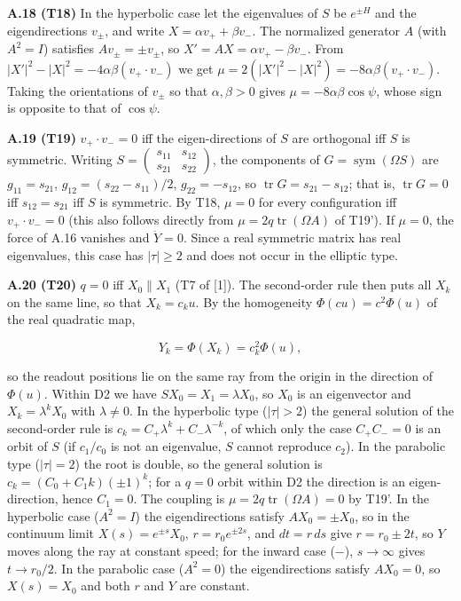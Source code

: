 \documentclass[
  a4paper,
]{article}
\begin{document}
\textbf{A.18 (T18)} In the hyperbolic case let the eigenvalues of \(S\)
be \(e^{\pm H}\) and the eigendirections \(v_\pm\), and write
\(X=\alpha v_++\beta v_-\). The normalized generator \(A\) (with
\(A^2=I\)) satisfies \(Av_\pm=\pm v_\pm\), so
\(X'=AX=\alpha v_+-\beta v_-\). From
\(\lvert X'\rvert^2-\lvert X\rvert^2=-4\alpha\beta(v_+\!\cdot v_-)\) we
get
\(\mu=2(\lvert X'\rvert^2-\lvert X\rvert^2)=-8\alpha\beta(v_+\!\cdot v_-)\).
Taking the orientations of \(v_\pm\) so that \(\alpha,\beta>0\) gives
\(\mu=-8\alpha\beta\cos\psi\), whose sign is opposite to that of
\(\cos\psi\).

\textbf{A.19 (T19)} \(v_+\!\cdot v_-=0\) iff the eigen-directions of
\(S\) are orthogonal iff \(S\) is symmetric. Writing
\(S=\begin{pmatrix}s_{11}&s_{12}\\s_{21}&s_{22}\end{pmatrix}\), the
components of \(G=\operatorname{sym}(\Omega S)\) are \(g_{11}=s_{21}\),
\(g_{12}=(s_{22}-s_{11})/2\), \(g_{22}=-s_{12}\), so
\(\operatorname{tr}G=s_{21}-s_{12}\); that is, \(\operatorname{tr}G=0\)
iff \(s_{12}=s_{21}\) iff \(S\) is symmetric. By T18, \(\mu=0\) for
every configuration iff \(v_+\!\cdot v_-=0\) (this also follows directly
from \(\mu=2q\operatorname{tr}(\Omega A)\) of T19'). If \(\mu=0\), the
force of A.16 vanishes and \(\ddot Y=0\). Since a real symmetric matrix
has real eigenvalues, this case has \(\lvert\tau\rvert\ge2\) and does
not occur in the elliptic type.

\textbf{A.20 (T20)} \(q=0\) iff \(X_0\parallel X_1\) (T7 of {[}1{]}).
The second-order rule then puts all \(X_k\) on the same line, so that
\(X_k=c_ku\). By the homogeneity \(\Phi(cu)=c^2\Phi(u)\) of the real
quadratic map,

\[
Y_k=\Phi(X_k)=c_k^2\Phi(u),
\]

so the readout positions lie on the same ray from the origin in the
direction of \(\Phi(u)\). Within D2 we have \(SX_0=X_1=\lambda X_0\), so
\(X_0\) is an eigenvector and \(X_k=\lambda^kX_0\) with
\(\lambda\neq0\). In the hyperbolic type (\(\lvert\tau\rvert>2\)) the
general solution of the second-order rule is
\(c_k=C_+\lambda^k+C_-\lambda^{-k}\), of which only the case
\(C_+C_-=0\) is an orbit of \(S\) (if \(c_1/c_0\) is not an eigenvalue,
\(S\) cannot reproduce \(c_2\)). In the parabolic type
(\(\lvert\tau\rvert=2\)) the root is double, so the general solution is
\(c_k=(C_0+C_1k)(\pm1)^k\); for a \(q=0\) orbit within D2 the direction
is an eigen-direction, hence \(C_1=0\). The coupling is
\(\mu=2q\operatorname{tr}(\Omega A)=0\) by T19'. In the hyperbolic case
(\(A^2=I\)) the eigendirections satisfy \(AX_0=\pm X_0\), so in the
continuum limit \(X(s)=e^{\pm s}X_0\), \(r=r_0e^{\pm2s}\), and
\(dt=r\,ds\) give \(r=r_0\pm2t\), so \(Y\) moves along the ray at
constant speed; for the inward case (\(-\)), \(s\to\infty\) gives
\(t\to r_0/2\). In the parabolic case (\(A^2=0\)) the eigendirections
satisfy \(AX_0=0\), so \(X(s)=X_0\) and both \(r\) and \(Y\) are
constant.
\end{document}
